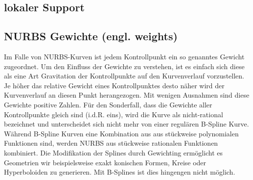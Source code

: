 \documentclass[german,a4paper,12pt,oneside]{scrbook}
\theoremstyle{definition}
\theoremstyle{definition}
\theoremstyle{definition}
\theoremstyle{definition}
\theoremstyle{definition}
\theoremstyle{definition}
\begin{document}
\subsection{lokaler Support}



\subsection{NURBS Gewichte (engl. weights)}
Im Falle von NURBS-Kurven ist jedem Kontrollpunkt ein so genanntes Gewicht zugeordnet. Um den Einfluss der Gewichte zu verstehen, ist es einfach sich diese als eine Art Gravitation der Kontrollpunkte auf den Kurvenverlauf vorzustellen. Je höher das relative Gewicht eines Kontrollpunktes desto näher wird der Kurvenverlauf an diesen Punkt herangezogen. Mit wenigen Ausnahmen sind diese Gewichte positive Zahlen. Für den Sonderfall, dass die Gewichte aller Kontrollpunkte gleich sind (i.d.R. eins), wird die Kurve als nicht-rational bezeichnet und unterscheidet sich nicht mehr von einer regulären B-Spline Kurve.  Während B-Spline Kurven eine Kombination aus aus stückweise polynomialen Funktionen sind, werden NURBS aus stückweise rationalen Funktionen kombiniert. Die Modifikation der Splines durch Gewichting ermöglicht es Geometrien wir beispielsweise exakt konischen Formen, Kreise oder Hyperboloiden zu generieren. Mit B-Splines ist dies hingengen nicht möglich. 
\end{document}
